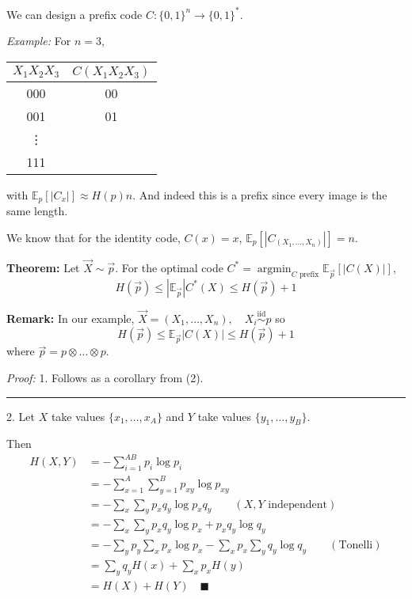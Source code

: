 \documentclass[12pt]{report}
\newcommand{\E}{\mathbb{E}}
\newcommand{\qed}{\quad \blacksquare}
\newcommand{\abs}[1]{\left\vert #1 \right\vert}
\renewcommand{\div}{\vspace*{10pt}\hrule\vspace*{10pt}}
\newcommand{\iid}{\overset{\text{iid}}{\sim}}
\newcommand*{\tbf}[1]{\ifmmode\mathbf{#1}\else\textbf{#1}\fi}
\DeclareMathOperator*{\argmin}{\arg\min}
\newenvironment*{tbox}[2][gray]{
    \begin{tcolorbox}[
        parbox=false,
        colback=#1!5!white,
        colframe=#1!75!black,
        breakable,
        title={#2}
    ]}
    {\end{tcolorbox}}
\newenvironment*{proposition}[1][gray]{
\begin{tcolorbox}[
    parbox=false,
    colback=#1!5!white,
    colframe=#1!75!black,
    breakable
]}
{\end{tcolorbox}}
\begin{document}
We can design a prefix code $C: \{0, 1\}^n \to \{0, 1\}^*$.

\emph{Example:} For $n = 3$,

\qquad\begin{tabular}{c|c}
	$X_1X_2X_3$ & $C(X_1X_2X_3)$ \\ \hline
	000         & 00             \\
	001         & 01             \\
	\vdots                       \\
	111
\end{tabular}

with $\E_p[\abs{C_x}] \approx H(p)n$. And indeed this is a prefix since every image is the same length.

We know that for the identity code, $C(x) = x$, $\E_p [\abs{C_{(X_1, \dots, X_n)}}] = n$.

\begin{proposition}
	\textbf{Theorem:} Let $\vec X \sim \vec p$. For the optimal code $C^* = \argmin_{C \text{ prefix}} \E_{\vec p} [\abs{C(X)}]$,
	\[H(\vec p) \leq \abs{\E_{\vec p}} C^*(X) \leq H(\vec p ) + 1\]
\end{proposition}

\tbf{Remark: }In our example, $\vec X = (X_1, \dots, X_n), \quad X_i \iid p$ so
\[H(\vec p) \leq \E_{\vec p} \abs{C(X)} \leq H(\vec p) + 1\]
where $\vec p = p \otimes \dots \otimes p$.

\begin{tbox}{\textbf{Claim:}
		\begin{enumerate}
			\item $H(\vec p) = nH(p)$.
			\item $H(X, Y) = H(X) + H(Y)$ if $X, Y$ independent
		\end{enumerate} }
	\emph{Proof:}
	1. Follows as a corollary from (2).

	\div

	2. Let $X$ take values $\{x_1, \dots, x_A\}$ and $Y$ take values $\{y_1, \dots, y_B\}$.

	Then
	\begin{align*}
		H(X, Y) & = -\sum_{i=1}^{AB} p_{i} \log p_{i}                                                        \\
		        & = -\sum_{x=1}^A \sum_{y=1}^B p_{xy} \log p_{xy}                                            \\
		        & = -\sum_x \sum_y p_x q_y \log p_x q_y \qquad (X, Y \text{ independent})                    \\
		        & = -\sum_x \sum_y p_x q_y \log p_x + p_x q_y \log q_y                                       \\
		        & = -\sum_y p_y \sum_x p_x \log p_x - \sum_x p_x \sum_y q_y \log q_y \qquad (\text{Tonelli}) \\
		        & = \sum_y q_y H(x) + \sum_x p_x H(y)                                                        \\
		        & = H(X) + H(Y) \qed
	\end{align*}
\end{tbox}
\end{document}
